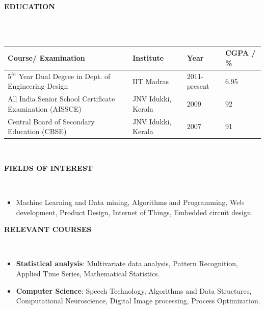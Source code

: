 \documentclass[a4paper,10pt]{article}
\newcommand{\lsep}{-0.5cm}
\newcommand{\resheading}[1]{{\small \colorbox{mygrey}{\begin{minipage}{0.975\textwidth}{\textbf{#1 \vphantom{p\^{E}}}}\end{minipage}}}}
\begin{document}
\resheading{\textbf{EDUCATION} }\\[\lsep]
    \\

    \indent \begin{tabularx}{0.97\textwidth}{ X  p{3.4cm}  p{2.3cm} p{2cm} }
    \hline
    \textbf{Course/ Examination} & \textbf{Institute} & \textbf{Year} & \textbf{CGPA / \%} \\
    \hline
    $5^{th}$ Year Dual Degree in Dept. of Engineering Design & IIT Madras & 2011-present & 6.95\\
    All India Senior School Certificate Examination (AISSCE) & JNV Idukki, Kerala & 2009 & 92\\
    Central Board of Secondary Education (CBSE) & JNV Idukki, Kerala & 2007 & 91\\
    \hline
    \end{tabularx}
    \\


\resheading{\textbf{FIELDS OF INTEREST} }\\[\lsep]
    \begin{itemize}
        \item \noindent Machine Learning and Data mining, Algorithms and Programming, Web development, Product Design, Internet of Things, Embedded circuit design.
    \end{itemize}

\resheading{\textbf{RELEVANT COURSES} }\\[\lsep]
\begin{itemize}
    \item \textbf{Statistical analysis}: Multivariate data analysis, Pattern Recognition, Applied Time Series, Mathematical Statistics.
    \vspace{-5pt}
    \item \textbf{Computer Science}: Speech Technology, Algorithms and Data Structures, Computational Neuroscience, Digital Image processing, Process Optimization.
    \vspace{-5pt}
\end{itemize}
\end{document}
